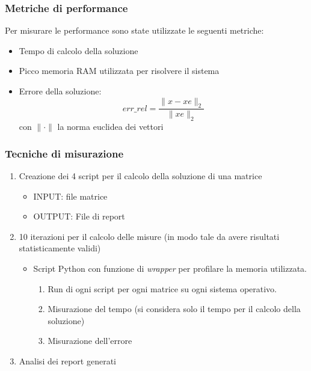 \documentclass{beamer}
\begin{document}
\begin{frame}
	\frametitle{Metriche di performance}
	Per misurare le performance sono state utilizzate le seguenti metriche:
	\begin{itemize}
		\item Tempo di calcolo della soluzione
		\item Picco memoria RAM utilizzata per risolvere il sistema
		\item Errore della soluzione: \[err \_ rel = \frac{\|x - xe\|_2}{\|xe\|_2}\]
		con $\| \cdot \|$ la norma euclidea dei vettori
	\end{itemize}
	\end{frame}

\begin{frame}
	
	\frametitle{Tecniche di misurazione}
		\begin{enumerate}
		\item Creazione dei 4 script per il calcolo della soluzione di una matrice
		\begin{itemize}
			\item INPUT: file matrice
			\item OUTPUT: File di report
		\end{itemize}

		\item 10 iterazioni per il calcolo delle misure (in modo tale da avere risultati statisticamente validi)
	
		\begin{itemize}
			\item Script Python con funzione di \textit{wrapper} per profilare la memoria utilizzata.
			\begin{enumerate}
				\item Run di ogni script per ogni matrice su ogni sistema operativo.

					\item Misurazione del tempo (si considera solo il tempo per il calcolo della soluzione)
					\item Misurazione dell'errore 

			\end{enumerate}
			
		\end{itemize}


		\item Analisi dei report generati				

	\end{enumerate}
\end{frame}
\end{document}
